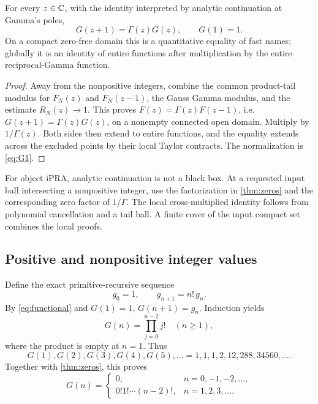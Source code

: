 \begin{theorem}\label{thm:functional}
For every \(z\in\mathbb C\), with the identity interpreted by analytic continuation at
Gamma's poles,
\begin{equation}\label{eq:functional}
 G(z+1)=\Gamma(z)G(z),\qquad G(1)=1.
\end{equation}
On a compact zero-free domain this is a quantitative equality of fast names;
globally it is an identity of entire functions after multiplication by the
entire reciprocal-Gamma function.
\end{theorem}

\begin{proof}
Away from the nonpositive integers, combine the common product-tail modulus for
\(F_N(z)\) and \(F_N(z-1)\), the Gauss Gamma modulus, and the estimate
\(R_N(z)\to1\).  This proves \(F(z)=\Gamma(z)F(z-1)\), i.e.
\(G(z+1)=\Gamma(z)G(z)\), on a nonempty connected open domain.  Multiply by
\(1/\Gamma(z)\).  Both sides then extend to entire functions, and the equality
extends across the excluded points by their local Taylor contracts.  The
normalization is \cref{eq:G1}.
\end{proof}

For object iPRA, analytic continuation is not a black box.  At a requested
input ball intersecting a nonpositive integer, use the factorization in
\cref{thm:zeros} and the corresponding zero factor of \(1/\Gamma\).  The local
cross-multiplied identity follows from polynomial cancellation and a tail ball.
A finite cover of the input compact set combines the local proofs.

\subsection{Positive and nonpositive integer values}

Define the exact primitive-recursive sequence
\begin{equation}\label{eq:gpos}
 g_0=1,
 \qquad g_{n+1}=n!\,g_n.
\end{equation}
By \cref{eq:functional} and \(G(1)=1\),
\(G(n+1)=g_n\).  Induction yields
\begin{equation}\label{eq:integerG}
 G(n)=\prod_{j=0}^{n-2}j!
 \quad(n\ge1),
\end{equation}
where the product is empty at \(n=1\).  Thus
\[
 G(1),G(2),G(3),G(4),G(5),\ldots
 =1,1,1,2,12,288,34560,\ldots.
\]
Together with \cref{thm:zeros}, this proves
\begin{equation}\label{eq:integer-all}
 G(n)=
 \begin{cases}
 0,&n=0,-1,-2,\ldots,\\
 0!1!\cdots(n-2)!,&n=1,2,3,\ldots.
 \end{cases}
\end{equation}

